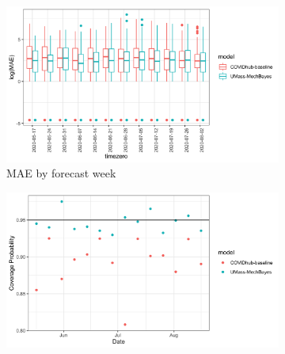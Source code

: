 \documentclass{umassthesis}          %
\begin{document}



\begin{figure}
  \centering
     \begin{subfigure}{.5\textwidth}
  \centering
    \includegraphics[scale=.135]{mae_results_by_time_zero_inc.png}
    \caption{MAE by forecast week}
\end{subfigure}%
\begin{subfigure}{.5\textwidth}
  \centering
    \includegraphics[scale=.115]{cp_results_by_time_zero.png}

\end{subfigure}
\end{figure}
\end{document}

